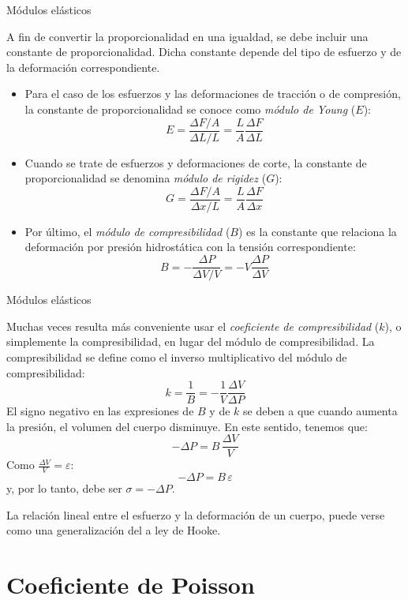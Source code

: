 \documentclass[11pt,handout,aspectratio=1610]{beamer}
\newcommand{\vs}{\vspace{11pt}}
\begin{document}
\begin{frame}{Módulos elásticos}

    A fin de convertir la proporcionalidad en una igualdad, se debe incluir una constante de proporcionalidad. Dicha constante depende del tipo de esfuerzo y de la deformación correspondiente.

    \begin{itemize}
        \item Para el caso de los esfuerzos y las deformaciones de tracción o de compresión, la constante de proporcionalidad se conoce como \emph{módulo de Young} ($E$): $$ E = \frac{\Delta F/A}{\Delta L /L} = \frac{L}{A} \frac{\Delta F}{\Delta L} $$
        \item Cuando se trate de esfuerzos y deformaciones de corte, la constante de proporcionalidad se denomina \emph{módulo de rigidez} ($G$): $$ G = \frac{\Delta F/A}{\Delta x / L} = \frac{L}{A} \frac{\Delta F}{\Delta x}$$
        \item Por último, el \emph{módulo de compresibilidad} ($B$) es la constante que relaciona la deformación por presión hidrostática con la tensión correspondiente: $$ B = - \frac{\Delta P}{\Delta V / V} = - V \frac{\Delta P}{\Delta V} $$
    \end{itemize}

\end{frame}

\begin{frame}{Módulos elásticos}

    Muchas veces resulta más conveniente usar el \emph{coeficiente de compresibilidad} ($k$), o simplemente la compresibilidad, en lugar del módulo de compresibilidad. La compresibilidad se define como el inverso multiplicativo del módulo de compresibilidad: $$ k = \frac{1}{B} = - \frac{1}{V} \frac{\Delta V}{\Delta P} $$ El signo negativo en las expresiones de $B$ y de $k$ se deben a que cuando aumenta la presión, el volumen del cuerpo disminuye. En este sentido, tenemos que: $$ - \Delta P = B \, \frac{\Delta V}{V} $$ Como $\frac{\Delta V}{V} = \varepsilon $: $$ - \Delta P = B \, \varepsilon $$ y, por lo tanto, debe ser $\sigma = - \Delta P$.

    \vs

    La relación lineal entre el esfuerzo y la deformación de un cuerpo, puede verse como una generalización del a ley de Hooke.

\end{frame}

\section{Coeficiente de Poisson}
\end{document}
